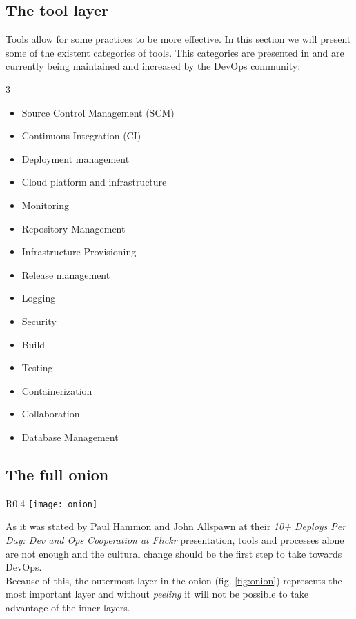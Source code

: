       \subsection{The tool layer} \label{chap:stateoftheart:sec:devops:sec:tools}
      Tools allow for some practices to be more effective. In this section we will present some of the existent categories of tools. This categories are presented in \cite{Labs} and are currently being maintained and increased by the DevOps community:
      \begin{multicols}{3}
        \begin{itemize}
            \item Source Control Management (SCM)
            \item Continuous Integration (CI)
            \item Deployment management
            \item Cloud platform and infrastructure
            \item Monitoring
        \end{itemize}
        \begin{itemize}
            \item Repository Management
            \item Infrastructure Provisioning
            \item Release management
            \item Logging
            \item Security
        \end{itemize}
        \begin{itemize}
            \item Build
            \item Testing
            \item Containerization
            \item Collaboration
            \item Database Management
        \end{itemize}
      \end{multicols}
\pagebreak
      \subsection{The full onion} \label{chap:stateoftheart:sec:devops:sec:onion}
        \begin{wrapfigure}{R}{0.4\textwidth}
            \center
            \texttt{[image: onion]}
            \caption{The DevOps onion \cite{DaveSayers2013}}
            \label{fig:onion}
        \end{wrapfigure}
        As it was stated by Paul Hammon and John Allspawn at their \textit{10+ Deploys Per Day: Dev and Ops Cooperation at Flickr} presentation, tools and processes alone are not enough and the cultural change should be the first step to take towards DevOps. \\
        Because of this, the outermost layer in the onion (fig. \ref{fig:onion}) represents the most important layer and without \textit{peeling} it will not be possible to take advantage of the  inner layers.

